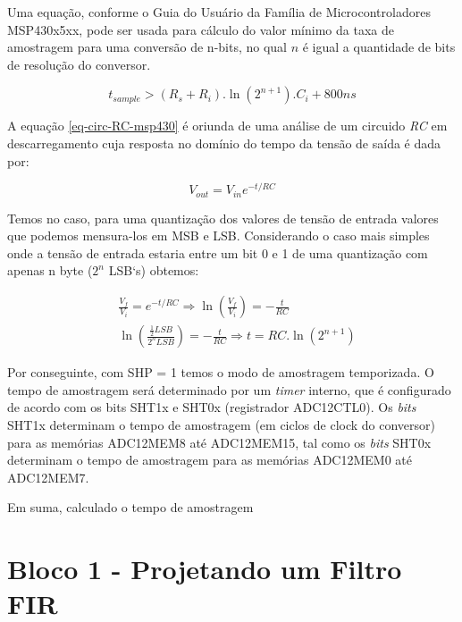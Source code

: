 			Uma equação, conforme o Guia do Usuário da Família de Microcontroladores MSP430x5xx, pode ser usada para cálculo do valor mínimo da taxa de amostragem para uma conversão de n-bits, no qual $ n $ é igual a quantidade de bits de resolução do conversor.
			
			\begin{equation}
				t_{sample} > (R_s + R_i) . \ln(2^{n+1}). C_i + 800ns
				\label{eq-circ-RC-msp430}
			\end{equation}
			
			A equação \ref{eq-circ-RC-msp430}  é oriunda de uma análise de um circuido \textit{RC} em descarregamento cuja resposta no domínio do tempo da tensão de saída é dada por:
			
			\begin{equation*}
				V_{out} = V_{in}e^{-t/{RC}}
			\end{equation*}
			
			Temos no caso, para uma quantização dos valores de tensão de entrada valores que podemos mensura-los em MSB e LSB. Considerando o caso mais simples onde a tensão de entrada estaria entre um bit 0 e 1 de uma quantização com apenas n byte ($ 2^n $ LSB`s) obtemos:
			
			\begin{equation}
				\begin{aligned}
						&\frac{V_f}{V_i} = e^{-t/{RC}}\Rightarrow \ln\left(\frac{V_f}{V_i}\right) = -\frac{t}{RC}\\
					&\ln\left(\frac{\frac{1}{2}LSB}{2^n LSB}\right) = -\frac{t}{RC}\Rightarrow \boxed{t = RC.\ln(2^{n+1})}
				\end{aligned}
			\end{equation}

			
			Por conseguinte, com SHP = 1 temos o modo de amostragem temporizada. O tempo de amostragem será determinado por um \textit{timer} interno, que é configurado de acordo com os bits SHT1x e SHT0x (registrador ADC12CTL0). Os \textit{bits} SHT1x determinam o tempo de amostragem (em ciclos de clock do conversor) para as memórias ADC12MEM8 até ADC12MEM15, tal como os \textit{bits} SHT0x determinam o tempo de amostragem para as memórias ADC12MEM0 até ADC12MEM7.
			
			Em suma, calculado o tempo de amostragem 
			
\section{Bloco 1 - Projetando um Filtro FIR}

